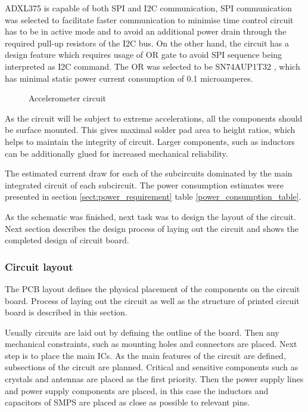 ADXL375 is capable of both SPI and I2C communication, SPI communication was selected to facilitate faster communication to minimise time control circuit has to be in active mode and to avoid an additional power drain through the required pull-up resistors of the I2C bus. On the other hand, the circuit has a design feature which requires usage of OR gate to avoid SPI sequence being interpreted as I2C command. The OR was selected to be SN74AUP1T32 \cite{orgate}, which has minimal static power current consumption of 0.1 microamperes. 

\begin{figure}[htb]
    \centering
    \def\svgwidth{\columnwidth}
    
    \caption{\label{fig:sensor_circuit} Accelerometer circuit}
\end{figure}

As the circuit will be subject to extreme accelerations, all the components should be surface mounted. This gives maximal solder pad area to height ratios, which helps to maintain the integrity of circuit. Larger components, such as inductors can be additionally glued for increased mechanical reliability.

The estimated current draw for each of the subcircuits dominated by the main integrated circuit of each subcircuit. The power consumption estimates were presented in section \ref{sect:power_requirement} table \ref{power_consumption_table}.

As the schematic was finished, next task was to design the layout of the circuit. Next section describes the design process of laying out the circuit and shows the completed design of circuit board.

\subsubsection{Circuit layout}
The PCB layout defines the physical placement of the components on the circuit board. Process of laying out the circuit as well as the structure of printed circuit board is described in this section.

Usually circuits are laid out by defining the outline of the board. Then any mechanical constraints, such as mounting holes and connectors are placed. Next step is to place the main ICs. As the main features of the circuit are defined, subsections of the circuit are planned. Critical and sensitive components such as crystals and antennas are placed as the first priority. Then the power supply lines and power supply components are placed, in this case the inductors and capacitors of SMPS are placed as close as possible to relevant pins. 

